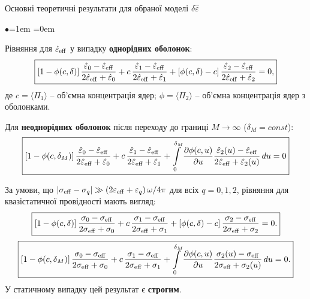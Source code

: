 \documentclass[10pt]{beamer}
\begin{document}
\begin{frame}{Основні теоретичні результати для обраної моделі $\delta\hat{\varepsilon}$}
\footnotesize

\begin{list}{$\bullet$}{\leftmargin=1em \itemindent=0em}
\item
Рівняння для $\hat{\varepsilon}_{\rm eff}$ у випадку \textbf{однорідних оболонок}:
\begin{equation}\label{eq:uniformshell}
\boxed{
\left[1-\phi(c, \delta)\right]\frac{\hat{\varepsilon}_0
-\hat{\varepsilon}_{\rm eff}}{2\hat{\varepsilon}_{\rm
eff}+\hat{\varepsilon}_0} + c\,\frac{\hat{\varepsilon}_1
-\hat{\varepsilon}_{\rm eff}}{2\hat{\varepsilon}_{\rm
eff}+\hat{\varepsilon}_1}
+\left[\phi(c, \delta)-c\right]\frac{\hat{\varepsilon}_2
-\hat{\varepsilon}_{\rm eff}}{2\hat{\varepsilon}_{\rm
eff}+\hat{\varepsilon}_2}=0, 
}
\end{equation}
де $c = \langle \Pi_1 \rangle$ -- об'ємна концентрація ядер; $\phi = \langle \Pi_2 \rangle$ -- об'ємна концентрація ядер з оболонками. 

\item
Для \textbf{неоднорідних оболонок} після переходу до границі $M \to \infty$ ($\delta_M = const$):
\begin{equation}\label{eq:nonuniformshell}
\boxed{
\left[1-\phi(c, \delta_M)\right]\frac{\hat{\varepsilon}_0
-\hat{\varepsilon}_{\rm eff}}{2\hat{\varepsilon} _{\rm
eff}+\hat{\varepsilon}_0}+ c\,\frac{\hat{\varepsilon}_1
-\hat{\varepsilon}_{\rm eff}}{2\hat{\varepsilon}_{\rm
eff}+\hat{\varepsilon}_1}
+\int\limits_0^{\delta_M}\frac{\partial \phi(c,u)}{\partial
u}\frac{\hat{\varepsilon}_2 (u) -\hat{\varepsilon}_{\rm
eff}}{2\hat{\varepsilon}_{\rm eff}+\hat{\varepsilon}_2 (u)}\,du
=0
}
\end{equation}

\item
За умови, що  $|\sigma_{\rm eff}-\sigma_{ q}|  \gg  
\left(2\varepsilon_{\rm eff} +\varepsilon_q \right) \omega/4\pi$ для всіх $q=0,1,2$,  рівняння для квазістатичної провідності мають вигляд:
\begin{equation*}\label{eq:conductivity}
\boxed{
\left[1-\phi(c, \delta)\right]\frac{\sigma_0 -\sigma_{\rm
eff}}{2\sigma_{\rm eff}+\sigma_0} + c\,\frac{\sigma_1 -\sigma_{\rm
eff}}{2\sigma_{\rm eff}+\sigma_1} 
+\left[\phi(c, \delta)-c\right]\frac{\sigma_2 -\sigma_{\rm
eff}}{2\sigma_{\rm eff}+\sigma_2}=0. 
}
\end{equation*}
\begin{equation*}\label{eq:nonuniformconductivity}
\boxed{
\left[1-\phi(c, \delta_M)\right]\frac{\sigma_0 -\sigma_{\rm
eff}}{2\sigma _{\rm eff}+\sigma_0}+ c\,\frac{\sigma_1 -\sigma_{\rm
eff}}{2\sigma_{\rm eff}+\sigma_1} 
+\int\limits_0^{\delta_M}\frac{\partial \phi(c,u)}{\partial
u}\frac{\sigma_2 (u) -\sigma_{\rm eff}}{2\sigma_{\rm eff}+\sigma_2
(u)}\,du =0.
}
\end{equation*}
У статичному випадку цей результат є \textbf{строгим}.

\end{list}

\end{frame}
\end{document}
